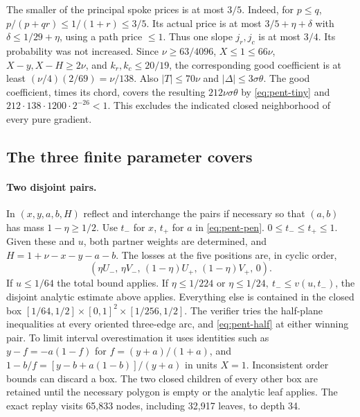 \documentclass[11pt,a4paper]{article}
\theoremstyle{definition}
\begin{document}
The smaller of the principal spoke prices is at most $3/5$. Indeed, for $p\le q$,
$p/(p+qr)\le1/(1+r)\le3/5$. Its actual price is at most
$3/5+\eta+\delta$ with $\delta\le1/29+\eta$, using a path price
$\le1$. Thus one slope $j_r,j_c$ is at most $3/4$. Its probability
was not increased. Since $\nu\ge63/4096$, $X\le1\le66\nu$,
$X-y,X-H\ge2\nu$, and $k_r,k_c\le20/19$, the corresponding good
coefficient is at least $(\nu/4)(2/69)=\nu/138$. Also
$|T|\le70\nu$ and $|\Delta|\le3\sigma\theta$. The good coefficient,
times its chord, covers the resulting $212\nu\sigma\theta$ by
\eqref{eq:pent-tiny} and $212\cdot138\cdot1200\cdot2^{-26}<1$.
This excludes the indicated closed neighborhood of every pure gradient.

\subsection{The three finite parameter covers}

\paragraph{Two disjoint pairs.}
In $(x,y,a,b,H)$ reflect and interchange the pairs if necessary so that
$(a,b)$ has mass $1-\eta\ge1/2$. Use $t_-$ for $x$, $t_+$ for $a$ in
\eqref{eq:pent-pen}. $0\le t_-\le t_+\le1$. Given these and $u$, both
partner weights are determined, and $H=1+\nu-x-y-a-b$.
The losses at the five positions are, in cyclic order,
\[
 (\eta U_-,\,\eta V_-,\,(1-\eta)U_+,\,(1-\eta)V_+,\,0).
\]
If $u\le1/64$ the total bound applies. If $\eta\le1/224$ or
$\eta\le1/24,\ t_-\le v(u,t_-)$, the disjoint analytic estimate above
applies. Everything else is contained in the closed box
$[1/64,1/2]\times[0,1]^2\times[1/256,1/2]$.
The verifier tries the half-plane inequalities at every oriented three-edge
arc, and \eqref{eq:pent-half} at either winning pair. To limit interval
overestimation it uses identities such as
$y-f=-a(1-f)$ for $f=(y+a)/(1+a)$, and
$1-b/f=[y-b+a(1-b)]/(y+a)$ in units $X=1$.
Inconsistent order bounds can discard a box. The two closed children of
every other box are retained until the necessary polygon is empty or the
analytic leaf applies. The exact replay visits 65,833 nodes, including
32,917 leaves, to depth 34.
\end{document}
